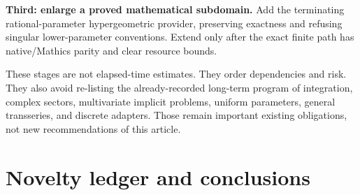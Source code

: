 \documentclass[11pt,letterpaper]{article}
\begin{document}
\textbf{Third: enlarge a proved mathematical subdomain.}
Add the terminating rational-parameter hypergeometric provider, preserving
exactness and refusing singular lower-parameter conventions. Extend only
after the exact finite path has native/Mathics parity and clear resource
bounds.

These stages are not elapsed-time estimates. They order dependencies and
risk. They also avoid re-listing the already-recorded long-term program of
integration, complex sectors, multivariate implicit problems, uniform
parameters, general transseries, and discrete adapters. Those remain
important existing obligations, not new recommendations of this article.
\cite{review-status,review-wave3}

\section{Novelty ledger and conclusions}
\label{sec:conclusions}
\end{document}
